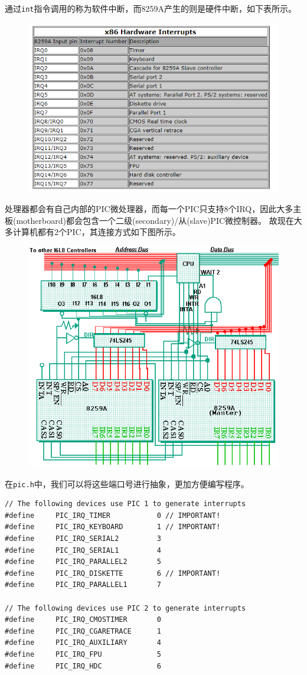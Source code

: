 \documentclass[logo,reportComp]{thesis}
\begin{document}
通过\verb'int'指令调用的称为软件中断，而8259A产生的则是硬件中断，如下表所示。
\begin{figure}[H]
\centering
\includegraphics[width=0.6\linewidth]{fig/hardware_interrupt.PNG}
\end{figure}

处理器都会有自己内部的PIC微处理器，而每一个PIC只支持8个IRQ，因此大多主板(motherboard)都会包含一个二级(secondary)/从(slave)PIC微控制器。
故现在大多计算机都有2个PIC，其连接方式如下图所示。
\begin{figure}[H]
\centering
\includegraphics[width=0.6\linewidth]{fig/8259A.png}
\end{figure}

在\verb'pic.h'中，我们可以将这些端口号进行抽象，更加方便编写程序。
\begin{lstlisting}
// The following devices use PIC 1 to generate interrupts
#define		PIC_IRQ_TIMER			0 // IMPORTANT!
#define		PIC_IRQ_KEYBOARD		1 // IMPORTANT!
#define		PIC_IRQ_SERIAL2			3
#define		PIC_IRQ_SERIAL1			4
#define		PIC_IRQ_PARALLEL2		5
#define		PIC_IRQ_DISKETTE		6 // IMPORTANT!
#define		PIC_IRQ_PARALLEL1		7

// The following devices use PIC 2 to generate interrupts
#define		PIC_IRQ_CMOSTIMER		0
#define		PIC_IRQ_CGARETRACE		1
#define		PIC_IRQ_AUXILIARY		4
#define		PIC_IRQ_FPU				5
#define		PIC_IRQ_HDC				6
\end{lstlisting}
\end{document}
